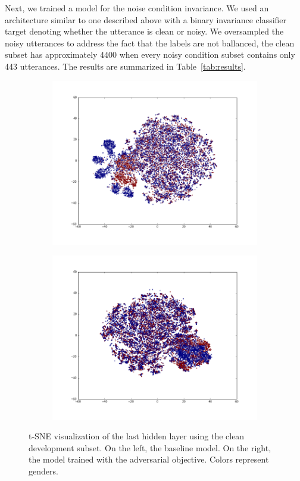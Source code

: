 \documentclass{article}
\begin{document}
Next, we trained a model for the noise condition invariance. We used an architecture
similar to one described above with a binary invariance classifier target denoting 
whether the utterance is clean or noisy. We oversampled the noisy utterances to 
address the fact that the labels are not ballanced, the clean subset has approximately 4400
when every noisy condition subset contains only 443 utterances. The results are
summarized in Table~\ref{tab:results}.

\begin{figure}
    \centering
    \begin{subfigure}[b]{0.5\linewidth}
        \centering
        \includegraphics[width=\linewidth]{tsne-original.png}
    \end{subfigure}%
    \begin{subfigure}[b]{0.5\linewidth}
        \centering
        \includegraphics[width=\linewidth]{tsne-invariant.png}
    \end{subfigure}%
    \caption{t-SNE visualization of the last hidden layer using the clean development
    subset. On the left, the baseline
    model. On the right, the model trained with the adversarial objective. Colors 
    represent genders.}
    \label{fig:tsne}
\end{figure}
\end{document}

